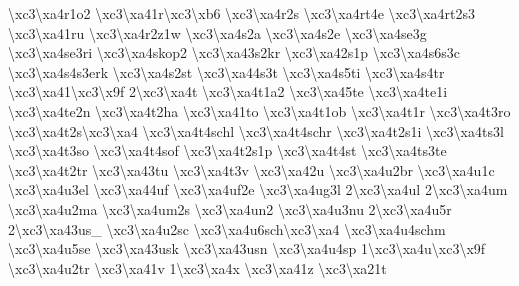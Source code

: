 \begin{DoxyCompactItemize}
\textbackslash{}xc3\textbackslash{}xa4r1o2 \textbackslash{}xc3\textbackslash{}xa41r\textbackslash{}xc3\textbackslash{}xb6 \textbackslash{}xc3\textbackslash{}xa4r2s \textbackslash{}xc3\textbackslash{}xa4rt4e \textbackslash{}xc3\textbackslash{}xa4rt2s3 \textbackslash{}xc3\textbackslash{}xa41ru \textbackslash{}xc3\textbackslash{}xa4r2z1w \textbackslash{}xc3\textbackslash{}xa4s2a \textbackslash{}xc3\textbackslash{}xa4s2e \textbackslash{}xc3\textbackslash{}xa4se3g \textbackslash{}xc3\textbackslash{}xa4se3ri \textbackslash{}xc3\textbackslash{}xa4skop2 \textbackslash{}xc3\textbackslash{}xa43s2kr \textbackslash{}xc3\textbackslash{}xa42s1p \textbackslash{}xc3\textbackslash{}xa4s6s3c \textbackslash{}xc3\textbackslash{}xa4s4s3erk \textbackslash{}xc3\textbackslash{}xa4s2st \textbackslash{}xc3\textbackslash{}xa44s3t \textbackslash{}xc3\textbackslash{}xa4s5ti \textbackslash{}xc3\textbackslash{}xa4s4tr \textbackslash{}xc3\textbackslash{}xa41\textbackslash{}xc3\textbackslash{}x9f 2\textbackslash{}xc3\textbackslash{}xa4t \textbackslash{}xc3\textbackslash{}xa4t1a2 \textbackslash{}xc3\textbackslash{}xa45te \textbackslash{}xc3\textbackslash{}xa4te1i \textbackslash{}xc3\textbackslash{}xa4te2n \textbackslash{}xc3\textbackslash{}xa4t2ha \textbackslash{}xc3\textbackslash{}xa41to \textbackslash{}xc3\textbackslash{}xa4t1ob \textbackslash{}xc3\textbackslash{}xa4t1r \textbackslash{}xc3\textbackslash{}xa4t3ro \textbackslash{}xc3\textbackslash{}xa4t2s\textbackslash{}xc3\textbackslash{}xa4 \textbackslash{}xc3\textbackslash{}xa4t4schl \textbackslash{}xc3\textbackslash{}xa4t4schr \textbackslash{}xc3\textbackslash{}xa4t2s1i \textbackslash{}xc3\textbackslash{}xa4ts3l \textbackslash{}xc3\textbackslash{}xa4t3so \textbackslash{}xc3\textbackslash{}xa4t4sof \textbackslash{}xc3\textbackslash{}xa4t2s1p \textbackslash{}xc3\textbackslash{}xa4t4st \textbackslash{}xc3\textbackslash{}xa4ts3te \textbackslash{}xc3\textbackslash{}xa4t2tr \textbackslash{}xc3\textbackslash{}xa43tu \textbackslash{}xc3\textbackslash{}xa4t3v \textbackslash{}xc3\textbackslash{}xa42u \textbackslash{}xc3\textbackslash{}xa4u2br \textbackslash{}xc3\textbackslash{}xa4u1c \textbackslash{}xc3\textbackslash{}xa4u3el \textbackslash{}xc3\textbackslash{}xa44uf \textbackslash{}xc3\textbackslash{}xa4uf2e \textbackslash{}xc3\textbackslash{}xa4ug3l 2\textbackslash{}xc3\textbackslash{}xa4ul 2\textbackslash{}xc3\textbackslash{}xa4um \textbackslash{}xc3\textbackslash{}xa4u2ma \textbackslash{}xc3\textbackslash{}xa4um2s \textbackslash{}xc3\textbackslash{}xa4un2 \textbackslash{}xc3\textbackslash{}xa4u3nu 2\textbackslash{}xc3\textbackslash{}xa4u5r 2\textbackslash{}xc3\textbackslash{}xa43us\-\_\- \textbackslash{}xc3\textbackslash{}xa4u2sc \textbackslash{}xc3\textbackslash{}xa4u6sch\textbackslash{}xc3\textbackslash{}xa4 \textbackslash{}xc3\textbackslash{}xa4u4schm \textbackslash{}xc3\textbackslash{}xa4u5se \textbackslash{}xc3\textbackslash{}xa43usk \textbackslash{}xc3\textbackslash{}xa43usn \textbackslash{}xc3\textbackslash{}xa4u4sp 1\textbackslash{}xc3\textbackslash{}xa4u\textbackslash{}xc3\textbackslash{}x9f \textbackslash{}xc3\textbackslash{}xa4u2tr \textbackslash{}xc3\textbackslash{}xa41v 1\textbackslash{}xc3\textbackslash{}xa4x \textbackslash{}xc3\textbackslash{}xa41z \textbackslash{}xc3\textbackslash{}xa21t 
\end{DoxyCompactItemize}
